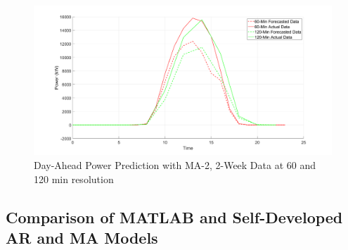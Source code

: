 \documentclass[journal]{IEEEtran}
\begin{document}
\begin{figure}[htpb]
	\centering
	\includegraphics[scale=0.2]{DiffTimeResolution_60_120_Min.png}
	\caption{Day-Ahead Power Prediction with MA-2, 2-Week Data at 60 and 120 min resolution}
	\label{fig15} %
\end{figure}

\subsection{Comparison of MATLAB and Self-Developed AR and MA Models}
\end{document}
